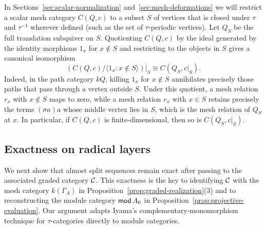 In Sections~\ref{sec:scalar-normalization} and~\ref{sec:mesh-deformations}
we will restrict a scalar mesh category $C(Q,c)$ to a subset $S$ of vertices
that is closed under $\tau$ and $\tau^{-1}$ wherever defined (such as the
set of $\tau$-periodic vertices). Let $Q_S$ be the full translation
subquiver on $S$. Quotienting $C(Q,c)$ by the ideal generated by the
identity morphisms $1_x$ for $x\notin S$ and restricting to the objects in
$S$ gives a canonical isomorphism
\begin{equation}
 \left(C(Q,c)/\langle 1_x:x\notin S\rangle\right)\big|_S
       \cong C(Q_S,c|_S).
 \label{eq:mesh-object-quotient}
\end{equation}
Indeed, in the path category $kQ$, killing $1_x$ for $x\notin S$ annihilates
precisely those paths that pass through a vertex outside $S$. Under this
quotient, a mesh relation $r_x$ with $x\notin S$ maps to zero, while a mesh
relation $r_x$ with $x\in S$ retains precisely the terms $(\sigma a)a$ whose
middle vertex lies in $S$, which is the mesh relation of $Q_S$ at $x$. In
particular, if $C(Q,c)$ is finite-dimensional, then so is $C(Q_S,c|_S)$.

\subsection{Exactness on radical layers}

We next show that almost split sequences remain exact after passing to the
associated graded category $\mathcal C$. This exactness is the key to identifying
$\mathcal C$ with the mesh category $k(\Gamma_A)$ in
Proposition~\ref{prop:graded-realization}(3) and to reconstructing the module
category $\operatorname{\mathsf{mod}} A_0$ in Proposition~\ref{prop:projective-evaluation}. Our
argument adapts Iyama's complementary-monomorphism technique for
$\tau$-categories \cite[Sections~3.3, 3.6 and~4.2]{IyamaI} directly to module
categories.


